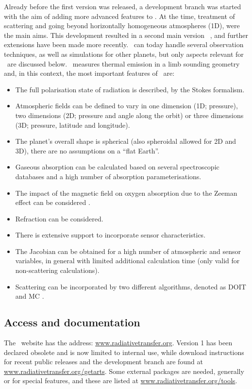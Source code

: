 Already before the first version was released, a development branch was started
with the aim of adding more advanced features to \ARTS. At the time, treatment
of scattering and going beyond horizontally homogeneous atmospheres (1D), were
the main aims. This development resulted in a second main version \ARTS\
\citep{eriksson:arts2:11}, and further extensions have been made more recently.
\ARTS\ can today handle several observation techniques, as well as simulations
for other planets, but only aspects relevant for \smr\ are discussed below.
\smr\ measures thermal emission in a limb sounding geometry and, in this
context, the most important features of \ARTS\ are:
\begin{itemize}
\item The full polarisation state of radiation is described, by the Stokes
  formalism.
\item Atmospheric fields can be defined to vary in one dimension (1D;
  pressure), two dimensions (2D; pressure and angle along the orbit) or three
  dimensions (3D; pressure, latitude and longitude).
\item The planet's overall shape is spherical (also spheroidal allowed for 2D
  and 3D), there are no assumptions on a ``flat Earth''.
\item Gaseous absorption can be calculated based on several spectroscopic
  databases and a high number of absorption parameterisations.
\item The impact of the magnetic field on oxygen absorption due to the Zeeman
  effect can be considered \citep{larsson:zeema:14}.
\item Refraction can be considered.
\item There is extensive support to incorporate sensor characteristics.
\item The Jacobian can be obtained for a high number of atmospheric and sensor
  variables, in general with limited additional calculation time (only valid
  for non-scattering calculations).
\item Scattering can be incorporated by two different algorithms, denoted as DOIT
  \citep{emde:apoli:04} and MC \citep{davisetal:04}.
\end{itemize}



\subsection{Access and documentation}
%
The \ARTS\ website has the address: \url{www.radiativetransfer.org}. Version 1
has been declared obsolete and is now limited to internal use, while download
instructions for recent public releases and the development branch are found
at \url{www.radiativetransfer.org/getarts}. Some external packages are needed,
generally or for special features, and these are listed at
\url{www.radiativetransfer.org/tools}.

